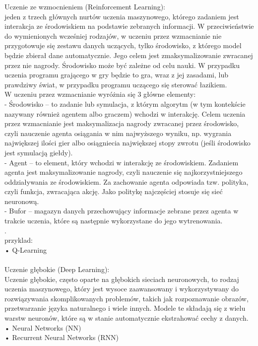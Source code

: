     
Uczenie ze wzmocnieniem (Reinforcement Learning):\\
 jeden z trzech głównych nurtów uczenia maszynowego, którego zadaniem jest interakcja ze środowiskiem na podstawie zebranych informacji. W przeciwieństwie do wymienionych wcześniej rodzajów, w uczeniu przez wzmacnianie nie przygotowuje się zestawu danych uczących, tylko środowisko, z którego model będzie zbierał dane automatycznie. Jego celem jest zmaksymalizowanie zwracanej przez nie nagrody. Środowisko może być zależne od celu nauki. W przypadku uczenia programu grającego w gry będzie to gra, wraz z jej zasadami, lub prawdziwy świat, w przypadku programu uczącego się sterować łazikiem.\\
W uczeniu przez wzmacnianie wyróżnia się 3 główne elementy:\\

   - Środowisko – to zadanie lub symulacja, z którym algorytm (w tym kontekście nazywany również agentem albo graczem) wchodzi w interakcję. Celem uczenia przez wzmacnianie jest maksymalizacja nagrody zwracanej przez środowisko, czyli nauczenie agenta osiągania w nim najwyższego wyniku, np. wygrania największej ilości gier albo osiągniecia największej stopy zwrotu (jeśli środowisko jest symulacją giełdy).\\
   - Agent – to element, który wchodzi w interakcję ze środowiskiem. Zadaniem agenta jest maksymalizowanie nagrody, czyli nauczenie się najkorzystniejszego oddziaływania ze środowiskiem. Za zachowanie agenta odpowiada tzw. polityka, czyli funkcja, zwracająca akcję. Jako politykę najczęściej stosuje się sieć neuronową.\\
   - Bufor – magazyn danych przechowujący informacje zebrane przez agenta w trakcie uczenia, które są następnie wykorzystane do jego wytrenowania.\\
. \\
przyklad:\\
    • Q-Learning\\\\
Uczenie głębokie (Deep Learning):\\
Uczenie głębokie, często oparte na głębokich sieciach neuronowych, to rodzaj uczenia maszynowego, który jest wysoce zaawansowany i wykorzystywany do rozwiązywania skomplikowanych problemów, takich jak rozpoznawanie obrazów, przetwarzanie języka naturalnego i wiele innych. Modele te składają się z wielu warstw neuronów, które są w stanie automatycznie ekstrahować cechy z danych. \\
    • Neural Networks (NN)\\
    • Recurrent Neural Networks (RNN)\\
\cite{gove2023}

